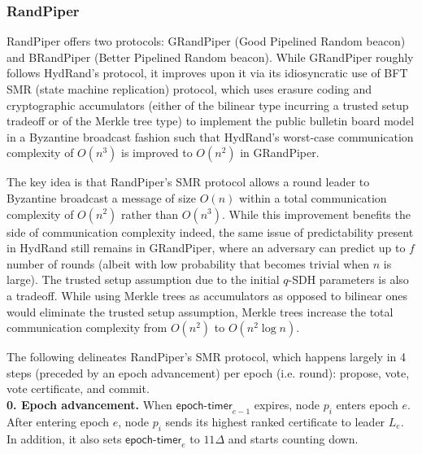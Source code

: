 \documentclass[letterpaper,twocolumn,10pt]{article}
\theoremstyle{definition}
\theoremstyle{remark}
\begin{document}
\subsubsection{RandPiper}
RandPiper offers two protocols: GRandPiper (Good Pipelined Random beacon) and BRandPiper (Better Pipelined Random beacon). While GRandPiper roughly follows HydRand's protocol, it improves upon it via its idiosyncratic use of BFT SMR (state machine replication) protocol, which uses erasure coding and cryptographic accumulators (either of the bilinear type incurring a trusted setup tradeoff or of the Merkle tree type) to implement the public bulletin board model in a Byzantine broadcast fashion such that HydRand's worst-case communication complexity of $O(n^3)$ is improved to $O(n^2)$ in GRandPiper.

The key idea is that RandPiper's SMR protocol allows a round leader to Byzantine broadcast a message of size $O(n)$ within a total communication complexity of $O(n^2)$ rather than $O(n^3)$. While this improvement benefits the side of communication complexity indeed, the same issue of predictability present in HydRand still remains in GRandPiper, where an adversary can predict up to $f$ number of rounds (albeit with low probability that becomes trivial when $n$ is large). The trusted setup assumption due to the initial $q$-SDH parameters is also a tradeoff. While using Merkle trees as accumulators as opposed to bilinear ones would eliminate the trusted setup assumption, Merkle trees increase the total communication complexity from $O(n^2)$ to $O(n^2 \log n)$.

The following delineates RandPiper's SMR protocol, which happens largely in 4 steps (preceded by an epoch advancement) per epoch (i.e. round): propose, vote, vote certificate, and commit.\\

\textbf{0. Epoch advancement.} When $\mathsf{epoch\mbox{-}timer}_{e - 1}$ expires, node $p_i$ enters epoch $e$. After entering epoch $e$, node $p_i$ sends its highest ranked certificate to leader $L_e$. In addition, it also sets $\mathsf{epoch\mbox{-}timer}_e$ to $11 \Delta$ and starts counting down.\\
\end{document}

